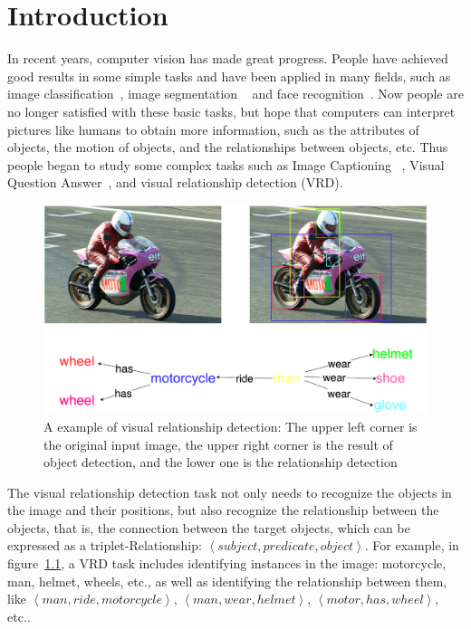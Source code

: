 \chapter{Introduction}
\label{chap:introduction}
\setcounter{page}{1}

In recent years, computer vision has made great progress. People have achieved good results in some simple tasks and have been applied in many fields, such as image classification~\cite{yu2017convolutional, lu2007survey}, image segmentation ~\cite{pham2000current} and face recognition~\cite{ahonen2006face, phillips1996feret}. Now people are no longer satisfied with these basic tasks, but hope that computers can interpret pictures like humans to obtain more information, such as the attributes of objects,  the motion of objects, and the relationships between objects, etc. Thus people began to study some complex tasks such as Image Captioning ~\cite{hossain2019comprehensive},  Visual Question Answer~\cite{antol2015vqa}, and  visual relationship detection (VRD). 

\begin{figure}[!htbp]
	\centering
	\includegraphics[width = 0.9 \textwidth]{figures/senen_graph.png}
	\caption[A example of visual relationship detection]
	{ A example of visual relationship detection: The upper left corner is the original input image, the upper right corner is the result of object detection, and the lower one is the relationship detection}
	\label{fig:sene}
\end{figure}

The visual relationship detection task not only needs to recognize the objects in the image and their positions, but also recognize the relationship between the objects, that is, the connection between the target objects, which can be expressed as a triplet-Relationship: $\left \langle subject, predicate, object\right \rangle$. For example, in figure~\ref{fig:sene}, a VRD task includes identifying instances in the image: motorcycle, man, helmet, wheels, etc., as well as identifying the relationship between them, like $\left \langle man, ride, motorcycle\right \rangle$, $\left \langle man, wear, helmet\right \rangle$, $\left \langle motor, has, wheel\right \rangle$, etc..


